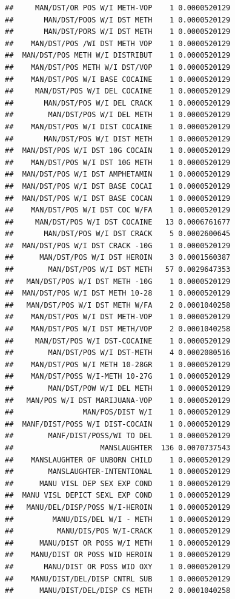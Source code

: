 \documentclass[]{book}
\begin{document}
\begin{verbatim}
##     MAN/DST/OR POS W/I METH-VOP    1 0.0000520129
##       MAN/DST/POOS W/I DST METH    1 0.0000520129
##       MAN/DST/PORS W/I DST METH    1 0.0000520129
##    MAN/DST/POS /WI DST METH VOP    1 0.0000520129
##  MAN/DST/POS METH W/I DISTRIBUT    1 0.0000520129
##    MAN/DST/POS METH W/I DST/VOP    1 0.0000520129
##    MAN/DST/POS W/I BASE COCAINE    1 0.0000520129
##     MAN/DST/POS W/I DEL COCAINE    1 0.0000520129
##       MAN/DST/POS W/I DEL CRACK    1 0.0000520129
##        MAN/DST/POS W/I DEL METH    1 0.0000520129
##    MAN/DST/POS W/I DIST COCAINE    1 0.0000520129
##       MAN/DST/POS W/I DIST METH    1 0.0000520129
##  MAN/DST/POS W/I DST 10G COCAIN    1 0.0000520129
##    MAN/DST/POS W/I DST 10G METH    1 0.0000520129
##  MAN/DST/POS W/I DST AMPHETAMIN    1 0.0000520129
##  MAN/DST/POS W/I DST BASE COCAI    1 0.0000520129
##  MAN/DST/POS W/I DST BASE COCAN    1 0.0000520129
##    MAN/DST/POS W/I DST COC W/FA    1 0.0000520129
##     MAN/DST/POS W/I DST COCAINE   13 0.0006761677
##       MAN/DST/POS W/I DST CRACK    5 0.0002600645
##  MAN/DST/POS W/I DST CRACK -10G    1 0.0000520129
##      MAN/DST/POS W/I DST HEROIN    3 0.0001560387
##        MAN/DST/POS W/I DST METH   57 0.0029647353
##   MAN/DST/POS W/I DST METH -10G    1 0.0000520129
##  MAN/DST/POS W/I DST METH 10-28    1 0.0000520129
##   MAN/DST/POS W/I DST METH W/FA    2 0.0001040258
##    MAN/DST/POS W/I DST METH-VOP    1 0.0000520129
##    MAN/DST/POS W/I DST METH/VOP    2 0.0001040258
##     MAN/DST/POS W/I DST-COCAINE    1 0.0000520129
##        MAN/DST/POS W/I DST-METH    4 0.0002080516
##    MAN/DST/POS W/I METH 10-28GR    1 0.0000520129
##    MAN/DST/POSS W/I-METH 10-27G    1 0.0000520129
##        MAN/DST/POW W/I DEL METH    1 0.0000520129
##   MAN/POS W/I DST MARIJUANA-VOP    1 0.0000520129
##                MAN/POS/DIST W/I    1 0.0000520129
##  MANF/DIST/POSS W/I DIST-COCAIN    1 0.0000520129
##        MANF/DIST/POSS/WI TO DEL    1 0.0000520129
##                    MANSLAUGHTER  136 0.0070737543
##    MANSLAUGHTER OF UNBORN CHILD    1 0.0000520129
##        MANSLAUGHTER-INTENTIONAL    1 0.0000520129
##      MANU VISL DEP SEX EXP COND    1 0.0000520129
##  MANU VISL DEPICT SEXL EXP COND    1 0.0000520129
##   MANU/DEL/DISP/POSS W/I-HEROIN    1 0.0000520129
##         MANU/DIS/DEL W/I - METH    1 0.0000520129
##          MANU/DIS/POS W/I-CRACK    1 0.0000520129
##      MANU/DIST OR POSS W/I METH    1 0.0000520129
##    MANU/DIST OR POSS WID HEROIN    1 0.0000520129
##       MANU/DIST OR POSS WID OXY    1 0.0000520129
##    MANU/DIST/DEL/DISP CNTRL SUB    1 0.0000520129
##      MANU/DIST/DEL/DISP CS METH    2 0.0001040258

\end{verbatim}
\end{document}
